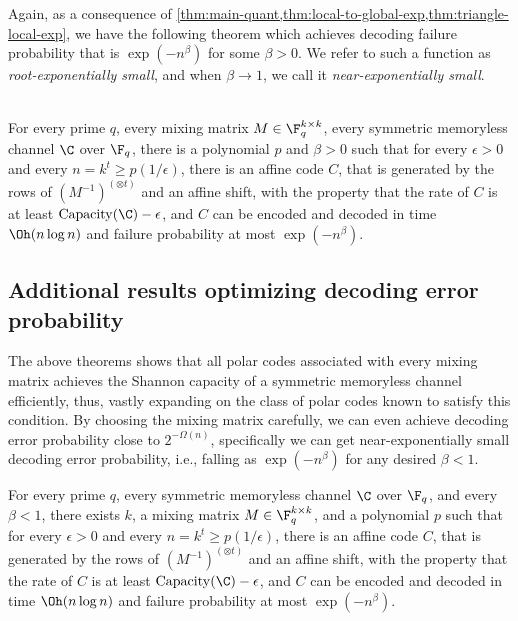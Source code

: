 \documentclass[11pt]{article}
\begin{document}
Again, as a consequence of \cref{thm:main-quant,thm:local-to-global-exp,thm:triangle-local-exp}, we have the following theorem which achieves decoding failure probability that is $\exp(-n^\beta)$ for some $\beta > 0$. We refer to such a function as \emph{root-exponentially small}, and when $\beta \to 1$, we call it \emph{near-exponentially small}. 


\begin{theorem}
	\label{thm:thm1}
	~\\ For every prime $q$, every mixing matrix $M\in\F_q^{k\times k}$, every symmetric memoryless channel $\C$ over $\F_q$, there is a polynomial $p$ and $\beta > 0$ such that for every $\epsilon > 0$ and every $n = k^t \geq p(1/\epsilon)$, 
	there is an affine code $C$, that is generated by the rows of $(M^{-1})^{(\otimes t)}$ and an affine shift, with the property that the rate of $C$ is at least $\mathrm{Capacity}(\C)-\epsilon$, and $C$ can be encoded and decoded in time $\Oh(n \log n)$ and failure probability at most 
	$\exp(-n^\beta)$.
\end{theorem}

\subsection{Additional results optimizing decoding error probability}
\label{sec:extra-results}

The above theorems shows that all polar codes associated with every mixing matrix achieves the Shannon capacity of a symmetric memoryless channel efficiently, thus, vastly expanding on the class of polar codes known to satisfy this condition.
By choosing the mixing matrix carefully, we can even achieve decoding error probability close to $2^{-\Omega(n)}$, specifically we can get near-exponentially small decoding error 
probability, i.e., falling as $\exp(-n^\beta)$ for any desired $\beta < 1$.

\begin{theorem}
	\label{thm:thm2}
	For every prime $q$, every symmetric memoryless channel $\C$ over $\F_q$, and every $\beta < 1$, there exists $k$, a  mixing matrix $M\in\F_q^{k\times k}$, and a polynomial $p$ such that for every $\epsilon > 0$ and every $n = k^t \geq p(1/\epsilon)$, 
	there is an affine code $C$, that is generated by the rows of $(M^{-1})^{(\otimes t)}$ and an affine shift, with the property that the rate of $C$ is at least $\mathrm{Capacity}(\C)-\epsilon$, and $C$ can be encoded and decoded in time $\Oh(n \log n)$ and failure probability at most 
	$\exp(-n^\beta)$.
\end{theorem}
\end{document}
